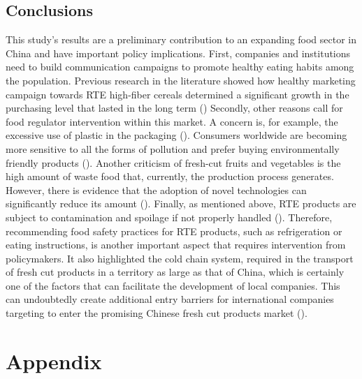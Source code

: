 \documentclass[a4,12pt]{article}
\begin{document}
\subsection{Conclusions}
This study's results are a preliminary contribution to an expanding food sector in China and have important policy implications. First, companies and institutions need to build communication campaigns to promote healthy eating habits among the population. Previous research in the literature showed how healthy marketing campaign towards RTE high-fiber cereals determined a significant growth in the purchasing level that lasted in the long term (\cite{Levy87}) Secondly, other reasons call for food regulator intervention within this market. A concern is, for example, the excessive use of plastic in the packaging (\cite{Tarancon21}). Consumers worldwide are becoming more sensitive to all the forms of pollution and prefer buying environmentally friendly products (\cite{Hartmann12}). Another criticism of fresh-cut fruits and vegetables is the high amount of waste food that, currently, the production process generates. However, there is evidence that the adoption of novel technologies can significantly reduce its amount (\cite{Plazzotta17}).  Finally, as mentioned above, RTE products are subject to contamination and spoilage if not properly handled (\cite{Evans16}). Therefore, recommending food safety practices for RTE products, such as refrigeration or eating instructions, is another important aspect that requires intervention from policymakers. 
It also highlighted the cold chain system, required in the transport of fresh cut products in a territory as large as that of China, which is certainly one of the factors that can facilitate the development of local companies. This can undoubtedly create additional entry barriers for international companies targeting to enter the promising Chinese fresh cut products market (\cite{ACE}).



\section{Appendix}
\end{document}
